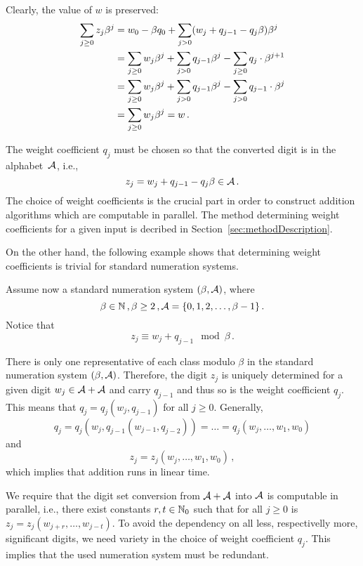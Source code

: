      Clearly, the value of $w$ is preserved:
\begin{align}
\label{eq:valuePreserving}
    \sum_{j\geq 0} z_j \beta^j &=w_0 - \beta q_0 + \sum_{j> 0} (w_j + q_{j-1} - q_j \beta) \beta^j \notag\\
    &=\sum_{j\geq 0} w_j \beta^j + \sum_{j>0} q_{j-1} \beta^j - \sum_{j\geq 0} q_j \cdot \beta^{j+1}  \\
    &=\sum_{j\geq 0} w_j \beta^j + \sum_{j>0} q_{j-1} \beta^j - \sum_{j> 0} q_{j-1} \cdot \beta^j \notag\\
    &=\sum_{j\geq 0} w_j \beta^j = w\,. \notag
\end{align}

     The weight coefficient $q_j$ must be chosen so that the converted digit is in the alphabet~$\mathcal{A}$, i.e., 
    \begin{equation}
    \label{eq:conversionFormula}
        z_j=w_j + q_{j-1} - q_j \beta \in \mathcal{A}\,.
    \end{equation} 
    The choice of weight coefficients is the crucial part in order to construct addition algorithms which are computable in parallel. The method determining weight coefficients for a given input is decribed in Section~\ref{sec:methodDescription}.
    
    
     On the other hand, the following example shows that determining weight coefficients is trivial for standard numeration systems.
     
     \begin{exmp}
        Assume now a standard numeration system $(\beta, \mathcal{A})$, where
  $$
    \beta \in \mathbb{N}\,,\beta  \geq 2\,, \mathcal{A} = \{0, 1, 2,\dots, \beta -1 \}\,.
  $$ 
       Notice that
    $$
        z_j \equiv w_j+q_{j-1} \mod \beta\,. 
    $$
  
  There is only one representative of each class modulo  $\beta$ in the standard numeration system $(\beta, \mathcal{A})$. Therefore, the digit $z_j$ is uniquely determined for a given digit $w_j \in \mathcal{A}+\mathcal{A}$ and carry $q_{j-1}$ and thus so is the weight coefficient $q_j$. This means that $q_j=q_j(w_j,q_{j-1})$ for all $j\geq 0$. Generally,
  $$
  q_j=q_j(w_j,q_{j-1}(w_{j-1},q_{j-2}))=\dots =q_j(w_j ,\dots , w_1, w_0)
  $$
  and
  $$
  z_j=z_j(w_j ,\dots , w_1, w_0)\,,
  $$
  which implies that addition runs in linear time.
     
     \end{exmp}
  
  We require that the digit set conversion from $\mathcal{A}+\mathcal{A}$ into $\mathcal{A}$ is computable in parallel, i.e., there exist constants $r,t \in \mathbb{N}_0$ such that for all $j\geq 0$ is $z_j=z_j(w_{j+r},\dots,w_{j-t})$. To avoid the dependency on all less, respectivelly more, significant digits, we need variety in the choice of weight coefficient $q_j$. This implies that the used numeration system must be redundant.
  

